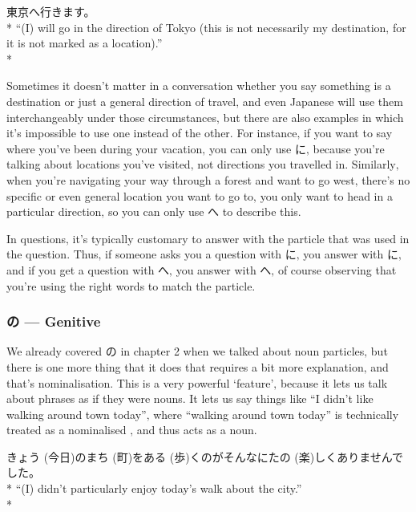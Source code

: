 \documentclass[11pt, b5paper, twoside, openright, onecolumn]{book}
\makeatletter
\newcommand*{\rubystack}[2]{{\relscale{0.5}%
  \begin{tabular}[b]{@{}c@{}}%
    {#1}\\%
   {\textscale{2}{#2}}%
  \end{tabular}}%
}
\DeclareRobustCommand*{\ruby}[2]{%
  \mbox{%
    \setlength{\parskip}{0ex}%
    \BeginAccSupp{method=pdfstringdef,ActualText={#1}}%
      \rubystack{\phantom{#2}}{#1}%
      \llap{%
        \rubystack{#2}{\phantom{#1}}%
      }%
    \EndAccSupp{}%
  }%
}
\renewcommand*{\ruby}[2]{#2 (#1)}%
\newenvironment{exampleblock}{
\setlength{\parindent}{0.6in}
\begin{minipage}[t]{\dimexpr\textwidth-\parindent}}
{\end{minipage}}
\makeatother
\begin{document}
\begin{exampleblock}
東京へ行きます。 \\* 
“(I) will go in the direction of Tokyo (this is not necessarily my destination‚ for it is not marked as a location).” \\* 
\end{exampleblock}
\vspace{0.2cm}

Sometimes it doesn’t matter in a conversation whether you say something is a destination or just a general direction of travel‚ and even Japanese will use them interchangeably under those circumstances‚ but there are also examples in which it’s impossible to use one instead of the other. For instance‚ if you want to say where you’ve been during your vacation‚ you can only use に‚ because you’re talking about locations you’ve visited‚ not directions you travelled in. Similarly‚ when you’re navigating your way through a forest and want to go west‚ there’s no specific or even general location you want to go to‚ you only want to head in a particular direction‚ so you can only use へ to describe this.

In questions‚ it’s typically customary to answer with the particle that was used in the question. Thus‚ if someone asks you a question with に‚ you answer with に‚ and if you get a question with へ‚ you answer with へ‚ of course observing that you’re using the right words to match the particle.

\subsubsection{の — Genitive}

We already covered の in chapter 2 when we talked about noun particles‚ but there is one more thing that it does that requires a bit more explanation‚ and that’s nominalisation. This is a very powerful ‘feature’‚ because it lets us talk about phrases as if they were nouns. It lets us say things like “I didn’t like walking around town today”‚ where “walking around town today” is technically treated as a nominalised ‚ and thus acts as a noun.

\vspace{0.4cm}
\begin{exampleblock}
\ruby{今日}{きょう}の\ruby{町}{まち}を\ruby{歩}{ある}くのがそんなに\ruby{楽}{たの}しくありませんでした。 \\* 
“(I) didn’t particularly enjoy today’s walk about the city.” \\* 
\end{exampleblock}
\vspace{0.2cm}
\end{document}
